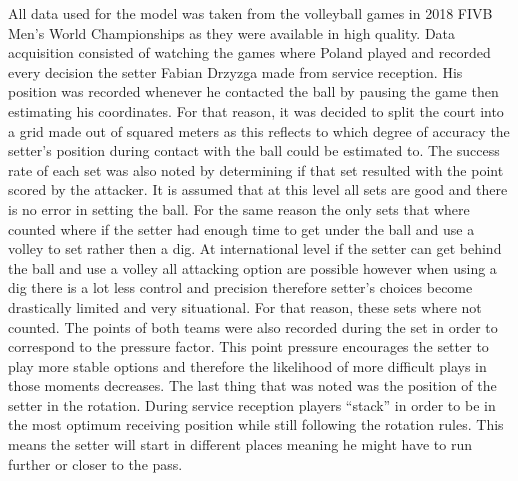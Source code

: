 \documentclass[main.tex]{subfiles}
\begin{document}
        
      All data used for the model was taken from the volleyball games in 2018 FIVB Men’s World Championships as they were available in high quality. Data acquisition consisted of watching the games where Poland played and recorded every decision the setter Fabian Drzyzga made from service reception. His position was recorded whenever he contacted the ball by pausing the game then estimating his coordinates.  For that reason, it was decided to split the court into a grid made out of squared meters as this reflects to which degree of accuracy the setter’s position during contact with the ball could be estimated to. The success rate of each set was also noted by determining if that set resulted with the point scored by the attacker. It is assumed that at this level all sets are good and there is no error in setting the ball. For the same reason the only sets that where counted where if the setter had enough time to get under the ball and use a volley to set rather then a dig. At international level if the setter can get behind the ball and use a volley all attacking option are possible however when using a dig there is a lot less control and precision therefore setter’s choices become drastically limited and very situational. For that reason, these sets where not counted. The points of both teams were also recorded during the set in order to correspond to the pressure factor. This point pressure encourages the setter to play more stable options and therefore the likelihood of more difficult plays in those moments decreases. The last thing that was noted was the position of the setter in the rotation. During service reception players “stack” in order to be in the most optimum receiving position while still following the rotation rules. This means the setter will start in different places meaning he might have to run further or closer to the pass.
\end{document}
